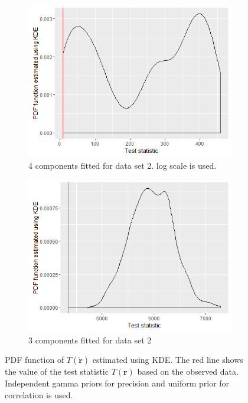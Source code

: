 \begin{figure}[!h]
	\centering
	\captionsetup{justification=centering}
	\begin{subfigure}[b]{0.4\textwidth}
		\includegraphics[width=\textwidth]{mainmatter/chapter_5_simulation_study/indpGammaPrior_ppc_3wellsep4comp.png}
        \caption{\label{fig : ppc_3wellsep4comp_indp_gammaprior}4 components fitted for data set 2. log scale is used.}
	\end{subfigure}
	\begin{subfigure}[b]{0.4\textwidth}
		\includegraphics[width=\textwidth]{mainmatter/chapter_5_simulation_study/indpGammaPrior_ppc_3wellsep3comp.png}
        \caption{\label{fig : ppc_3wellsep3comp_indp_gammaprior}3 components fitted for data set 2}
	\end{subfigure}
	\caption{PDF function of $T(\boldsymbol{\tilde{r}})$ estimated using KDE. The red line shows the value of the test statistic $T(\boldsymbol{r})$ based on the observed data. Independent gamma priors for precision and uniform prior for correlation is used.}
	\label{fig : ppc_3wellsepcomp_indp_gammaprior}
\end{figure}